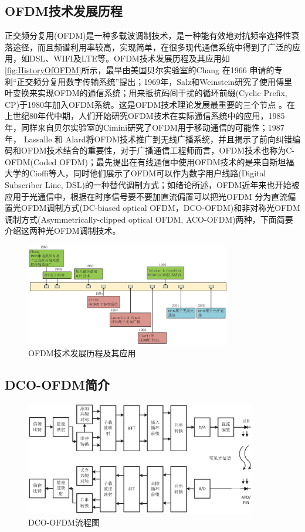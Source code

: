 \subsection{OFDM技术发展历程}
正交频分复用(OFDM)是一种多载波调制技术，是一种能有效地对抗频率选择性衰落途径，而且频谱利用率较高，实现简单，在很多现代通信系统中得到了广泛的应用，如DSL、WIFI及LTE等。OFDM技术发展历程及其应用如
\autoref{fig:HistoryOfOFDM}所示，最早由美国贝尔实验室的Chang 在1966 申请的专利“正交频分复用数字传输系统”提出；1969年，Salz和Weinstein研究了使用傅里叶变换来实现OFDM的通信系统；用来抵抗码间干扰的循环前缀(Cyclic Prefix, CP)于1980年加入OFDM系统。这是OFDM技术理论发展最重要的三个节点
\cite{armstrong2009ofdm}。在上世纪80年代中期，人们开始研究OFDM技术在实际通信系统中的应用，1985年，同样来自贝尔实验室的Cimini研究了OFDM用于移动通信的可能性；1987年， Lassalle 和 Alard将OFDM技术推广到无线广播系统，并且揭示了前向纠错编码和OFDM技术结合的重要性，对于广播通信工程师而言，OFDM技术也称为C-OFDM(Coded OFDM)；最先提出在有线通信中使用OFDM技术的是来自斯坦福大学的Cioffi等人，同时他们展示了OFDM可以作为数字用户线路(Digital Subscriber Line, DSL)的一种替代调制方式；如绪论所述，OFDM近年来也开始被应用于光通信中，根据在时序信号要不要加直流偏置可以把光OFDM 分为直流偏置光OFDM调制方式(DC-biased optical OFDM，DCO-OFDM)和非对称光OFDM调制方式(Asymmetrically-clipped optical OFDM, ACO-OFDM)两种，下面简要介绍这两种光OFDM调制技术。
\begin{figure}[htbp]
    \centering
    \includegraphics[width=0.8\textwidth]{figures/Chapter-2/HistoryOfOFDM.eps}
    \caption{OFDM技术发展历程及其应用}
    \label{fig:HistoryOfOFDM}
\end{figure}
\subsection{DCO-OFDM简介}
\begin{figure}[htbp]
    \centering
    \includegraphics[width=0.9\textwidth]{figures/Chapter-2/DCO-OFDMStructure.eps}
    \caption{DCO-OFDM流程图}
    \label{fig:DCO-OFDMStructure}
\end{figure}

